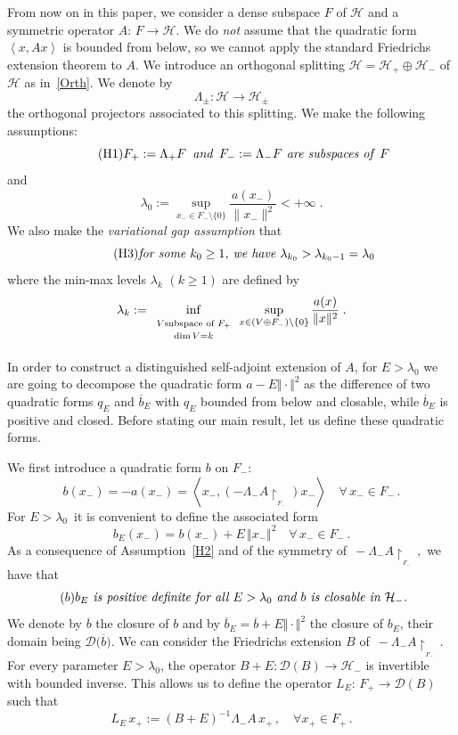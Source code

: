 \documentclass[12pt,reqno]{amsart}
\newcommand{\innerproduct}[2]{\left\langle #1, #2 \right\rangle}
\newcommand{\be}[1]{\begin{equation}\label{#1}}
\newcommand{\ee}{\end{equation}}
\renewcommand{\(}{\left(}
\renewcommand{\)}{\right)}
\begin{document}
From now on in this paper, we consider a dense subspace $F$ of $\mathcal H$ and a symmetric operator $A:\,F\rightarrow \mathcal H$. We do {\it not} assume that the quadratic form $\innerproduct{x}{Ax}$ is bounded from below, so we cannot apply the standard Friedrichs extension theorem to $A$. We introduce an orthogonal splitting $\mathcal H= \mathcal H_+\oplus\mathcal H_-$ of $\mathcal H$ as in~\eqref{Orth}. We denote by
\[
\Lambda_\pm:\mathcal H\rightarrow\mathcal H_\pm
\]
the orthogonal projectors associated to this splitting. We make the following assumptions:
\be{H1}\tag{H1}
\mbox{{\it $F_+:=\Lambda_+F\,$ and $\,F_-:=\Lambda_-F$ are subspaces of $\,F$}}
\ee
and
\be{H2}\tag{H2}
\lambda_0 := \sup_{x_-\in F_-\setminus\{0\}}\frac{a(x_-)}{\|x_-\|^2} < +\infty\;.
\ee
We also make the {\it variational gap assumption} that
\be{H3}\tag{H3}
\mbox{{\it for some $k_0\ge1$, we have $\lambda_{k_0}> \lambda_{k_0-1}=\lambda_0$}}
\ee
where the min-max levels $\lambda_k$ $(k\geq 1)$ are defined by
\be{min-max}
\lambda_k:=\inf_{\begin{array}{c}\scriptstyle V\mbox{\scriptsize subspace of }F_+\\[-2pt]\scriptstyle\mbox{\scriptsize dim}\,V=k\end{array}}\sup_{x\in(V\oplus F_-)\setminus\{0\}}\frac{a(x)}{\|x\|^2}\;.
\ee

\noindent In order to construct a distinguished self-adjoint extension of $A$, for $E>\lambda_0$ we are going to decompose the quadratic form $a-E\Vert\cdot\Vert^2$  as the difference of two quadratic forms $q_E$ and $\overline{b}_E$ with $q_E$ bounded from below and closable, while $\overline{b}_E$ is positive and closed. Before stating our main result, let us define these quadratic forms.\smallskip

\noindent
We first introduce a quadratic form $b$ on $F_-$:
\be{B}
b(x_-)=-a(x_-)=\innerproduct{x_-}{\(-\Lambda_- A\upharpoonright_{_{F_-}}\)x_-}\quad\forall\,x_-\in F_-\,.
\ee
For $E>\lambda_0\,$ it is  convenient to define the associated form
\be{Be}
b_E(x_-)=b(x_-)+E\,\Vert x_-\Vert^2\quad\forall\,x_-\in F_-\,.
\ee
As a consequence of Assumption~\eqref{H2} and of the symmetry of $\,-\Lambda_- A\upharpoonright_{_{F_-}}\,,$ we have that 
\be{closeformb}\tag{$b$}
\mbox{\parbox{10cm}{{\it $b_E$ is positive definite for all $E>\lambda_0$ and $b$ is closable in $\mathcal H_-$.}}}
\ee
 We denote by $\overline{b}$ the closure of $b$ and by $\overline{b}_E=\overline{b}+E\Vert\cdot\Vert^2$ the closure of $b_E$, their domain being $\mathcal D\big(\overline{b}\big)$. We can consider the Friedrichs extension $B$ of $\,-\Lambda_- A\upharpoonright_{_{F_-}}\,$. For every parameter $E>\lambda_0$, the operator $B+E: \mathcal D(B) \rightarrow \mathcal H_-$ is invertible with bounded inverse. This allows us to define the operator $L_E:\,F_+\rightarrow \mathcal D(B)$ such that 
\be{def L}
L_E\,x_+:= (B +E)^{-1}\Lambda_-A\,x_+\,,\quad \forall x_+\in F_+\,.
\ee
\end{document}
